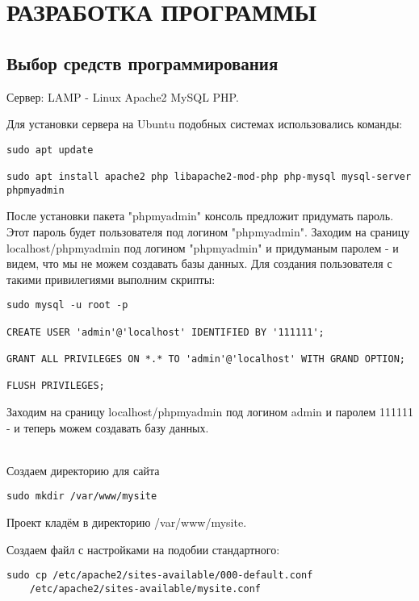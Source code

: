 \newpage

\section{РАЗРАБОТКА ПРОГРАММЫ}

\subsection{Выбор средств программирования}

Сервер: LAMP - Linux Apache2 MySQL PHP.

Для установки сервера на Ubuntu подобных системах использовались команды:

\begin{verbatim}
sudo apt update

sudo apt install apache2 php libapache2-mod-php php-mysql mysql-server phpmyadmin
\end{verbatim}

После установки пакета "phpmyadmin" консоль предложит придумать пароль. Этот пароль будет пользователя под логином "phpmyadmin". Заходим на сраницу localhost/phpmyadmin под логином "phpmyadmin" и придуманым паролем - и видем, что мы не можем создавать базы данных. Для создания пользователя с такими привилегиями выполним скрипты:

\begin{verbatim}
sudo mysql -u root -p

CREATE USER 'admin'@'localhost' IDENTIFIED BY '111111';

GRANT ALL PRIVILEGES ON *.* TO 'admin'@'localhost' WITH GRAND OPTION;

FLUSH PRIVILEGES;
\end{verbatim}

Заходим на сраницу localhost/phpmyadmin под логином admin и паролем 111111 - и теперь можем создавать базу данных.

\hspace{0pt}\\

Создаем директорию для сайта

\begin{verbatim}
sudo mkdir /var/www/mysite
\end{verbatim}

Проект кладём в директорию /var/www/mysite.

Создаем файл с настройками на подобии стандартного:

\begin{verbatim}
sudo cp /etc/apache2/sites-available/000-default.conf
    /etc/apache2/sites-available/mysite.conf
\end{verbatim}

